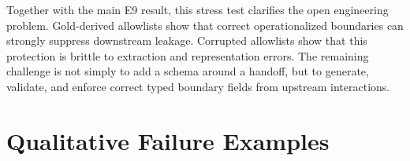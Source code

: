 Together with the main E9 result, this stress test clarifies the open engineering problem. Gold-derived allowlists show that correct operationalized boundaries can strongly suppress downstream leakage. Corrupted allowlists show that this protection is brittle to extraction and representation errors. The remaining challenge is not simply to add a schema around a handoff, but to generate, validate, and enforce correct typed boundary fields from upstream interactions.




\section{Qualitative Failure Examples}
\label{app:qualitative}

